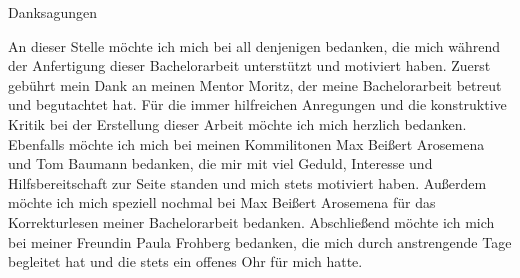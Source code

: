 \documentclass[12pt,letterpaper,ngerman]{article}
\begin{document}
\begin{center}
\makeatletter

{\normalfont\bfseries} Danksagungen
\makeatother
\end{center}
\vspace{10mm}
An dieser Stelle möchte ich mich bei all denjenigen bedanken,
die mich während der Anfertigung dieser Bachelorarbeit unterstützt 
und motiviert haben.
Zuerst gebührt mein Dank an meinen Mentor Moritz,
der meine Bachelorarbeit betreut und begutachtet hat.
Für die immer hilfreichen Anregungen und die konstruktive
Kritik bei der Erstellung dieser Arbeit möchte ich mich 
herzlich bedanken.
Ebenfalls möchte ich mich bei meinen Kommilitonen 
Max Beißert Arosemena und Tom Baumann bedanken, 
die mir mit viel Geduld, Interesse und Hilfsbereitschaft
zur Seite standen und mich stets motiviert haben.
Außerdem möchte ich mich speziell nochmal bei 
Max Beißert Arosemena für das Korrekturlesen meiner 
Bachelorarbeit bedanken.
Abschließend möchte ich mich bei meiner Freundin 
Paula Frohberg bedanken, die mich durch anstrengende 
Tage begleitet hat und
die stets ein offenes Ohr für mich hatte.
\cleardoublepage{}
\end{document}
